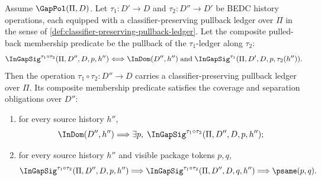 \begin{theorem}
\label{thm:composite-pullback-gap-policy-preserves-coverage-and-separation}
Assume $\GapPol(\Pi,D)$. Let $\tau_1:D'\to D$ and $\tau_2:D''\to D'$ be BEDC history operations, each equipped with a classifier-preserving pullback ledger over $\Pi$ in the sense of \autoref{def:classifier-preserving-pullback-ledger}. Let the composite pulled-back membership predicate be the pullback of the $\tau_1$-ledger along $\tau_2$:
$$
  {\InGapSig}^{\tau_1\circ\tau_2}(\Pi,D'',D,p,h'')
  \Longleftrightarrow
  \InDom(D'',h'')\;\text{and}\;
  {\InGapSig}^{\tau_1}(\Pi,D',D,p,\tau_2(h'')).
$$
Then the operation $\tau_1\circ\tau_2:D''\to D$ carries a classifier-preserving pullback ledger over $\Pi$. Its composite membership predicate satisfies the coverage and separation obligations over $D''$:
\begin{enumerate}
  \item for every source history $h''$,
  $$
    \InDom(D'',h'')\Longrightarrow
    \exists p,\;{\InGapSig}^{\tau_1\circ\tau_2}(\Pi,D'',D,p,h'');
  $$
  \item for every source history $h''$ and visible package tokens $p,q$,
  $$
    {\InGapSig}^{\tau_1\circ\tau_2}(\Pi,D'',D,p,h'')
    \Longrightarrow
    {\InGapSig}^{\tau_1\circ\tau_2}(\Pi,D'',D,q,h'')
    \Longrightarrow
    \psame(p,q).
  $$
\end{enumerate}
\end{theorem}

